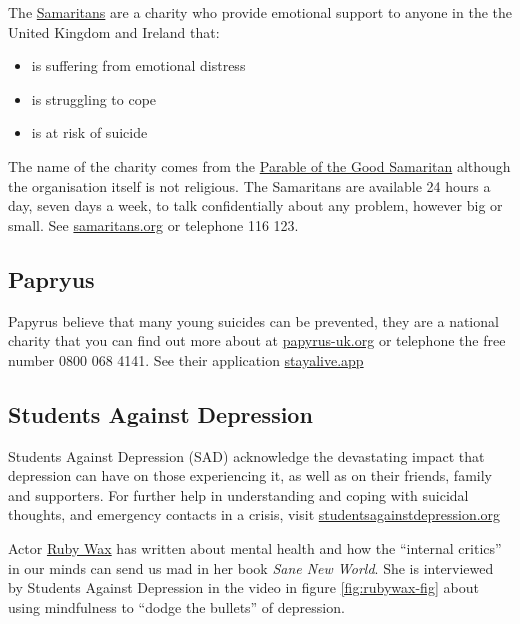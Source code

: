 \documentclass[
]{book}
\providecommand{\tightlist}{%
  \setlength{\itemsep}{0pt}\setlength{\parskip}{0pt}}
\begin{document}
The \href{https://en.wikipedia.org/wiki/Samaritans_(charity)}{Samaritans} are a charity who provide emotional support to anyone in the the United Kingdom and Ireland that:

\begin{itemize}
\tightlist
\item
  is suffering from emotional distress
\item
  is struggling to cope
\item
  is at risk of suicide
\end{itemize}

The name of the charity comes from the \href{https://en.wikipedia.org/wiki/Parable_of_the_Good_Samaritan}{Parable of the Good Samaritan} although the organisation itself is not religious. The Samaritans are available 24 hours a day, seven days a week, to talk confidentially about any problem, however big or small. See \href{https://www.samaritans.org/}{samaritans.org} or telephone 116 123.

\hypertarget{papryus}{%
\subsection{Papryus}\label{papryus}}

Papyrus believe that many young suicides can be prevented, they are a national charity that you can find out more about at \href{https://www.papyrus-uk.org/}{papyrus-uk.org} or telephone the free number 0800 068 4141. See their application \href{https://stayalive.app/}{stayalive.app}

\hypertarget{sad}{%
\subsection{Students Against Depression}\label{sad}}

Students Against Depression (SAD) acknowledge the devastating impact that depression can have on those experiencing it, as well as on their friends, family and supporters. For further help in understanding and coping with suicidal thoughts, and emergency contacts in a crisis, visit \href{https://www.studentsagainstdepression.org/}{studentsagainstdepression.org}

Actor \href{https://en.wikipedia.org/wiki/Ruby_Wax}{Ruby Wax} has written about mental health and how the ``internal critics'' in our minds can send us mad in her book \emph{Sane New World}. \citep{sanenewworld} She is interviewed by Students Against Depression in the video in figure \ref{fig:rubywax-fig} about using mindfulness to ``dodge the bullets'' of depression.
\end{document}
